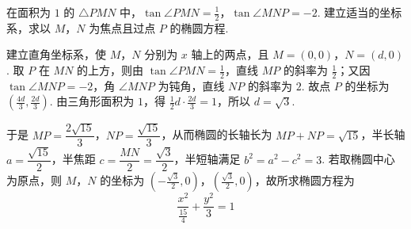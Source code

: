\documentclass[UTF8,a4paper,oneside,11pt]{ctexbook}
\begin{document}
\begin{problem}
在面积为 \(1\) 的 \(\triangle PMN\) 中，\(\tan \angle PMN=\frac{1}{2}\)，\(\tan \angle MNP=-2\). 建立适当的坐标系，求以 \(M\)，\(N\) 为焦点且过点 \(P\) 的椭圆方程.
\end{problem}

\begin{solution}
建立直角坐标系，使 \(M\)，\(N\) 分别为 \(x\) 轴上的两点，且 \(M=(0,0)\)，\(N=(d,0)\). 取 \(P\) 在 \(MN\) 的上方，则由 \(\tan\angle PMN=\frac12\)，直线 \(MP\) 的斜率为 \(\frac12\)；又因 \(\tan\angle MNP=-2\)，角 \(\angle MNP\) 为钝角，直线 \(NP\) 的斜率为 \(2\). 故点 \(P\) 的坐标为 \(\left(\frac{4d}{3},\frac{2d}{3}\right)\). 由三角形面积为 \(1\)，得 \(\frac12d\cdot\frac{2d}{3}=1\)，所以 \(d=\sqrt{3}\).

于是 \(MP=\dfrac{2\sqrt{15}}{3}\)，\(NP=\dfrac{\sqrt{15}}{3}\)，从而椭圆的长轴长为 \(MP+NP=\sqrt{15}\)，半长轴 \(a=\dfrac{\sqrt{15}}{2}\)，半焦距 \(c=\dfrac{MN}{2}=\dfrac{\sqrt{3}}{2}\)，半短轴满足 \(b^2=a^2-c^2=3\). 若取椭圆中心为原点，则 \(M\)，\(N\) 的坐标为 \(\left(-\frac{\sqrt{3}}{2},0\right)\)，\(\left(\frac{\sqrt{3}}{2},0\right)\)，故所求椭圆方程为
\[
\frac{x^2}{\frac{15}{4}}+\frac{y^2}{3}=1
\]
\end{solution}

\end{document}
